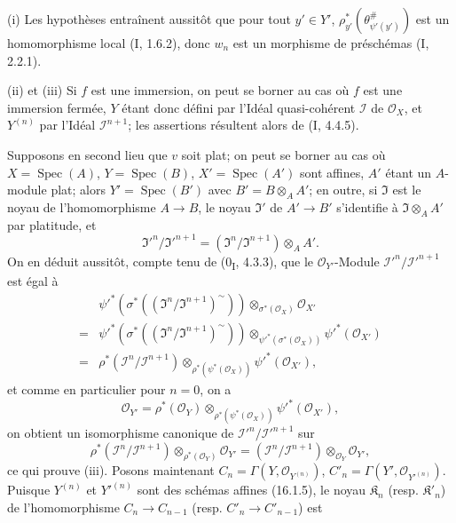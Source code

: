 \noindent(i) Les hypothèses entraînent aussitôt que pour tout $y'\in Y'$,
$\rho_{y'}^*(\theta_{\psi'(y')}^\#)$ est un homomorphisme local (I, 1.6.2),
donc $w_n$ est un morphisme de préschémas (I, 2.2.1).

\noindent(ii) et (iii) Si $f$ est une immersion, on peut se borner au cas où
$f$ est une immersion fermée, $Y$ étant donc défini par l'Idéal
quasi-cohérent $\mathscr{I}$ de $\mathcal{O}_X$, et $Y^{(n)}$ par l'Idéal
$\mathscr{I}^{n+1}$; les assertions résultent alors de (I, 4.4.5).

Supposons en second lieu que $v$ soit plat; on peut se borner au cas où
$X=\operatorname{Spec}(A)$, $Y=\operatorname{Spec}(B)$,
$X'=\operatorname{Spec}(A')$ sont affines, $A'$ étant un $A$-module plat;
alors $Y'=\operatorname{Spec}(B')$ avec $B'=B\otimes_A A'$; en outre, si
$\mathfrak{I}$ est le noyau de l'homomorphisme $A\to B$, le noyau
$\mathfrak{I}'$ de $A'\to B'$ s'identifie à $\mathfrak{I}\otimes_A A'$ par
platitude, et
\[
  \mathfrak{I}'^n/\mathfrak{I}'^{n+1}
  =(\mathfrak{I}^n/\mathfrak{I}^{n+1})\otimes_A A'.
\]
On en déduit aussitôt, compte tenu de (0\textsubscript{I}, 4.3.3), que le
$\mathcal{O}_{Y'}$-Module
$\mathscr{I}'^n/\mathscr{I}'^{n+1}$ est égal à
\begin{align*}
&\psi'^*\!\left(\sigma^*
  \left((\mathfrak{I}^n/\mathfrak{I}^{n+1})^{\sim}\right)\right)
  \otimes_{\sigma^*(\mathcal{O}_X)}\mathcal{O}_{X'} \\
={}&
\psi'^*\!\left(\sigma^*
  \left((\mathfrak{I}^n/\mathfrak{I}^{n+1})^{\sim}\right)\right)
  \otimes_{\psi'^*(\sigma^*(\mathcal{O}_X))}
  \psi'^*(\mathcal{O}_{X'}) \\
={}&
\rho^*(\mathscr{I}^n/\mathscr{I}^{n+1})
  \otimes_{\rho^*(\psi^*(\mathcal{O}_X))}
  \psi'^*(\mathcal{O}_{X'}),
\end{align*}
et comme en particulier pour $n=0$, on a
\[
  \mathcal{O}_{Y'}=
  \rho^*(\mathcal{O}_Y)
  \otimes_{\rho^*(\psi^*(\mathcal{O}_X))}
  \psi'^*(\mathcal{O}_{X'}),
\]
on obtient un isomorphisme canonique de
$\mathscr{I}'^n/\mathscr{I}'^{n+1}$ sur
\[
  \rho^*(\mathscr{I}^n/\mathscr{I}^{n+1})
  \otimes_{\rho^*(\mathcal{O}_Y)}\mathcal{O}_{Y'}
  =
  (\mathscr{I}^n/\mathscr{I}^{n+1})
  \otimes_{\mathcal{O}_Y}\mathcal{O}_{Y'},
\]
ce qui prouve (iii). Posons maintenant
$C_n=\Gamma(Y,\mathcal{O}_{Y^{(n)}})$,
$C'_n=\Gamma(Y',\mathcal{O}_{Y'^{(n)}})$. Puisque $Y^{(n)}$ et
$Y'^{(n)}$ sont des schémas affines (16.1.5), le noyau
$\mathfrak{K}_n$ (resp. $\mathfrak{K}'_n$) de l'homomorphisme
$C_n\to C_{n-1}$ (resp. $C'_n\to C'_{n-1}$) est
